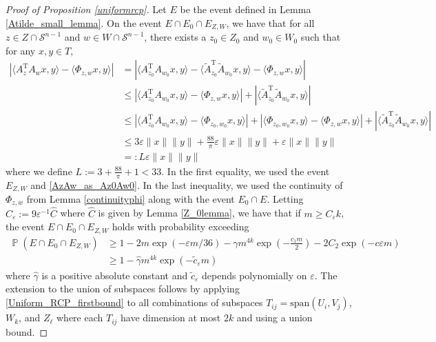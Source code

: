 \documentclass[11pt]{article}
\renewcommand{\epsilon}{\varepsilon}
\newcommand{\Pro}{\operatorname{\mathbb{P}}}
\newcommand{\Seps}{\mathcal{S}}
\renewcommand{\top}{{\mathrm{T}}}
\theoremstyle{remark}
\begin{document}
\begin{proof}[Proof of Proposition \ref{uniformrcp}]
 Let $E$ be the event defined in Lemma \ref{Atilde_small_lemma}. On the event $E \cap E_0 \cap E_{Z,W}$, we have that for all $z \in Z \cap \Seps^{n-1}$ and $w \in W \cap \Seps^{n-1}$, there exists a $z_0 \in Z_0$ and $w_0 \in W_0$ such that for any $x, y \in T$, \begin{align*}
\left|\langle A_z^\top A_w x,y \rangle - \langle \Phi_{z,w}x,y \rangle\right| & = \left|\langle A_{z_0}^{\top}A_{w_0} x,y \rangle - \langle\tilde{A}_{z_0}^{\top}\tilde{A}_{w_0}x,y\rangle - \langle \Phi_{z,w}x,y \rangle\right| \\
& \leqslant \left|\langle A_{z_0}^{\top}A_{w_0} x,y \rangle - \langle \Phi_{z,w}x,y \rangle\right| + | \langle\tilde{A}_{z_0}^{\top}\tilde{A}_{w_0}x,y\rangle| \\
& \leqslant \left|\langle A_{z_0}^{\top}A_{w_0} x,y \rangle - \langle \Phi_{z_0,w_0}x,y \rangle\right| + \left|\langle \Phi_{z_0,w_0}x,y \rangle - \langle \Phi_{z,w}x,y \rangle\right| + | \langle\tilde{A}_{z_0}^{\top}\tilde{A}_{w_0}x,y\rangle| \\
& \leqslant 3\epsilon \|x\|\|y\| + \frac{88}{\pi}\epsilon \|x\|\|y\| + \epsilon\|x\|\|y\|\\
& =: L \epsilon\|x\|\|y\|
\end{align*} where we define $L:= 3 + \frac{88}{\pi} + 1 < 33$. In the first equality, we used the event $E_{Z,W}$ and \eqref{AzAw_as_Az0Aw0}. In the last inequality, we used the continuity of $\Phi_{z,w}$ from Lemma \ref{continuityphi} along with the event $E_0 \cap E$. Letting $C_{\epsilon}:= 9 \epsilon^{-1}\hat{C}$ where $\hat{C}$ is given by Lemma \ref{Z_0lemma}, we have that if $m \geqslant C_{\epsilon}k$, the event $E \cap E_0 \cap E_{Z,W}$ holds with probability exceeding \begin{align*}
    \Pro\left(E \cap E_0 \cap E_{Z,W}\right) & \geqslant 1 - 2m\exp(-\epsilon m/36) - \gamma m^{4k}\exp\left(-\frac{c_1m}{2}\right) - 2C_2 \exp\left(-c\epsilon m\right) \\
    & \geqslant 1 - \hat{\gamma} m^{4k}\exp\left(-\tilde{c}_{\epsilon}m\right) 
\end{align*} where $\hat{\gamma}$ is a positive absolute constant and $\tilde{c}_{\epsilon}$ depends polynomially on $\epsilon$. The extension to the union of subspaces follows by applying \eqref{Uniform_RCP_firstbound} to all combinations of subspaces $T_{ij} = \text{span}(U_i,V_j)$, $W_k$, and $Z_{\ell}$ where each $T_{ij}$ have dimension at most $2k$ and using a union bound.
\end{proof}
\end{document}
